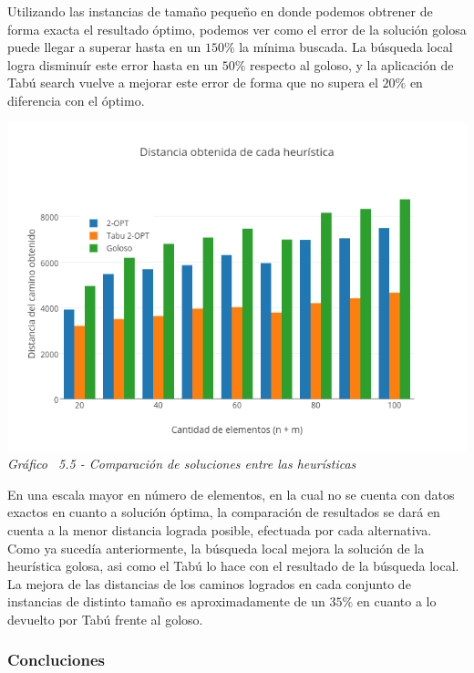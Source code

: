 Utilizando las instancias de tamaño pequeño en donde podemos obtrener de forma exacta el resultado óptimo, podemos ver como el error de la solución golosa puede llegar a superar hasta en un $150\%$ la mínima buscada. La búsqueda local logra disminuír este error hasta en un $50\%$ respecto al goloso, y la aplicación de Tabú search vuelve a mejorar este error de forma que no supera el $20\%$ en diferencia con el óptimo.


\vspace*{0.3cm} \vspace*{0.3cm}
  \begin{center}
 \includegraphics[scale=0.5]{./EJ5/comparativo1.png}\\
 {\textit{Gráfico \ 5.5 - Comparaci\'on de soluciones entre las heur\'isticas}}
  \end{center}
  \vspace*{0.3cm}

En una escala mayor en número de elementos, en la cual no se cuenta con datos exactos en cuanto a solución óptima, la comparación de resultados se dará en cuenta a la menor distancia lograda posible, efectuada por cada alternativa. Como ya sucedía anteriormente, la búsqueda local mejora la solución de la heurística golosa, asi como el Tabú lo hace con el resultado de la búsqueda local. La mejora de las distancias de los caminos logrados en cada conjunto de instancias de distinto tamaño es aproximadamente de un $35\%$ en cuanto a lo devuelto por Tabú frente al goloso.

\subsubsection{Concluciones}

